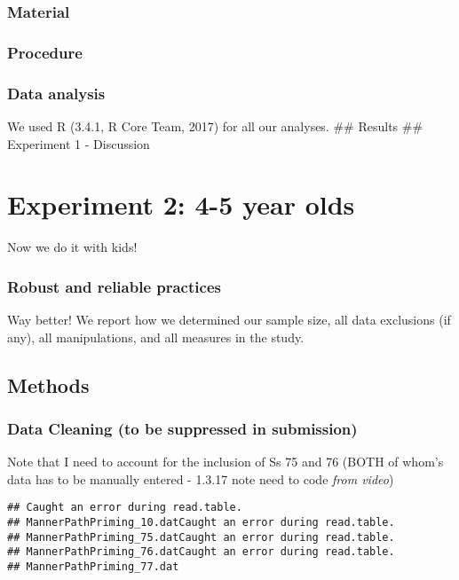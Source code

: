 \documentclass[english,man]{apa6}
\theoremstyle{definition}
\theoremstyle{definition}
\theoremstyle{remark}
\begin{document}
\subsubsection{Material}\label{material}

\subsubsection{Procedure}\label{procedure}

\subsubsection{Data analysis}\label{data-analysis}

We used R (3.4.1, R Core Team, 2017) for all our analyses. \#\# Results
\#\# Experiment 1 - Discussion

\section{Experiment 2: 4-5 year olds}\label{experiment-2-4-5-year-olds}

Now we do it with kids!

\subsubsection{Robust and reliable
practices}\label{robust-and-reliable-practices-1}

Way better! We report how we determined our sample size, all data
exclusions (if any), all manipulations, and all measures in the study.

\subsection{Methods}\label{methods-1}

\subsubsection{Data Cleaning (to be suppressed in
submission)}\label{data-cleaning-to-be-suppressed-in-submission-1}

Note that I need to account for the inclusion of Ss 75 and 76 (BOTH of
whom's data has to be manually entered - 1.3.17 note need to code
\emph{from video})

\begin{verbatim}
## Caught an error during read.table.
## MannerPathPriming_10.datCaught an error during read.table.
## MannerPathPriming_75.datCaught an error during read.table.
## MannerPathPriming_76.datCaught an error during read.table.
## MannerPathPriming_77.dat
\end{verbatim}
\end{document}
